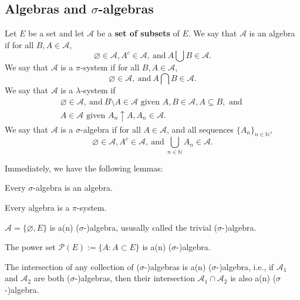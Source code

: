 \documentclass[11pt,singlecolumn, openany, citestyle=authoryear]{elegantbook}
\begin{document}
\begin{CJK}{UTF8}{gbsn}
\section{Algebras and $\sigma$-algebras}
\begin{definition}
    Let $E$ be a set and let $\mathcal{A} $ be a \textbf{set of subsets} of $E$.
    We say that $\mathcal{A}$ is an algebra if for all $B,A \in \mathcal{A}$,
    $$
    \varnothing \in \mathcal{A}, A^c \in \mathcal{A},\ \text{and}\ A\bigcup B \in \mathcal{A}.
    $$
    We say that $\mathcal{A}$ is a $\pi$-system if for all $B,A \in \mathcal{A}$,
    $$
    \varnothing \in \mathcal{A}, \ \text{and} \ A\bigcap B \in \mathcal{A}.
    $$
    We say that $\mathcal{A}$ is a $\lambda$-system if 
    \begin{gather*}
    \varnothing \in \mathcal{A}, \ \text{and} \ B\setminus A \in \mathcal{A}
    \text{ given } A,B \in \mathcal{A}, A \subseteq B, \text{ and }\\
    A \in \mathcal{A} \text{ given } A_n \uparrow A, A_n \in \mathcal{A}.
    \end{gather*}
    We say that $\mathcal{A}$ is a $\sigma$-algebra if for all $A \in \mathcal{A}$,
    and all sequences $\{A_n\}_{n \in \mathbb{N}}$,
    $$
    \varnothing \in \mathcal{A}, A^c \in \mathcal{A}, \ \text{and} \ 
    \bigcup_{n \in \mathbb{N}}A_n \in \mathcal{A}.
    $$
\end{definition}
Immediately, we have the following lemmas:

\begin{lemma}
    Every $\sigma$-algebra is an algebra.
\end{lemma}

\begin{lemma}
    Every algebra is a $\pi$-system.
\end{lemma}

\begin{example}
    $\mathcal{A} = \{\varnothing, E\}$ is a(n) ($\sigma$-)algebra, ususally called the trivial 
    ($\sigma$-)algebra.
\end{example}

\begin{example}
    The power set $\mathcal{P}(E):=\{A:A \subset E\}$ is a(n) ($\sigma$-)algebra.
\end{example}

\begin{lemma}
    The intersection of any collection of ($\sigma$-)algebras is a(n) ($\sigma$-)algebra, i.e.,
    if $\mathcal{A}_1$ and $\mathcal{A}_2$ are both ($\sigma$-)algebras, 
    then their intersection
    $\mathcal{A}_1 \cap \mathcal{A}_2$ is also a(n) ($\sigma$-)algebra. 
\end{lemma}


\end{CJK}
\end{document}
